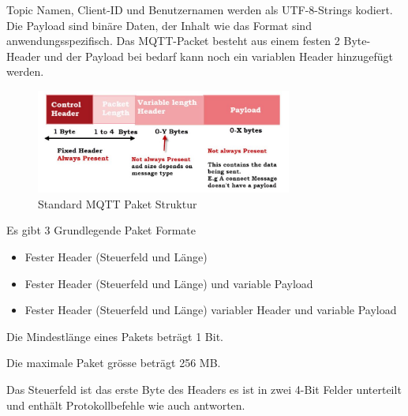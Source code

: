 Topic Namen, Client-ID und Benutzernamen werden als UTF-8-Strings kodiert. Die Payload sind binäre Daten, der Inhalt wie das Format sind anwendungsspezifisch. Das MQTT-Packet besteht aus einem festen 2 Byte-Header und der Payload bei bedarf kann noch ein variablen Header hinzugefügt werden.

\begin{figure}[H]
	\centering
	\includegraphics[width=0.75\textwidth]{graphics/MQTT-Standard-Packet.jpg}
	\caption{Standard MQTT Paket Struktur \cite{steve_understanding_nodate}} 	
	\label{pic: Struktur}
\end{figure} 

Es gibt 3 Grundlegende Paket Formate

\begin{itemize}
	\item Fester Header (Steuerfeld und Länge)\\
	\item Fester Header (Steuerfeld und Länge) und variable Payload\\
	\item Fester Header (Steuerfeld und Länge) variabler Header und variable Payload\\
\end{itemize}

Die Mindestlänge eines Pakets beträgt 1 Bit. 

Die maximale Paket grösse beträgt 256 MB.

Das Steuerfeld ist das erste Byte des Headers es ist in zwei 4-Bit Felder unterteilt und enthält Protokollbefehle wie auch antworten.